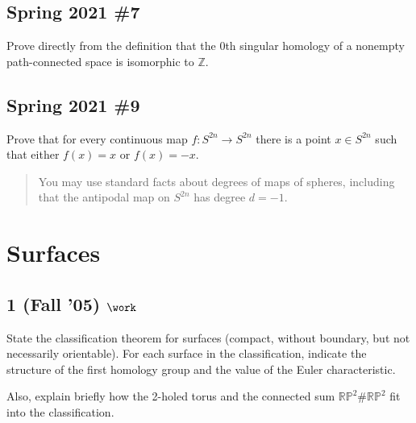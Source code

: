 \hypertarget{spring-2021-7}{%
\subsection{Spring 2021 \#7}\label{spring-2021-7}}

\begin{problem}[Spring 2021, 7]

Prove directly from the definition that the 0th singular homology of a
nonempty path-connected space is isomorphic to \({\mathbb{Z}}\).

\end{problem}

\hypertarget{spring-2021-9}{%
\subsection{Spring 2021 \#9}\label{spring-2021-9}}

\begin{problem}[Spring 2021, 9]

Prove that for every continuous map \(f: S^{2n} \to S^{2n}\) there is a
point \(x\in S^{2n}\) such that either \(f(x) = x\) or \(f(x) = -x\).

\begin{quote}
You may use standard facts about degrees of maps of spheres, including
that the antipodal map on \(S^{2n}\) has degree \(d=-1\).
\end{quote}

\end{problem}

\hypertarget{surfaces}{%
\section{Surfaces}\label{surfaces}}

\hypertarget{fall-05-work-1}{%
\subsection{\texorpdfstring{1 (Fall '05)
\(\work\)}{1 (Fall '05) \textbackslash work}}\label{fall-05-work-1}}

State the classification theorem for surfaces (compact, without
boundary, but not necessarily orientable). For each surface in the
classification, indicate the structure of the first homology group and
the value of the Euler characteristic.

Also, explain briefly how the 2-holed torus and the connected sum
\({\mathbb{RP}}^2 \# {\mathbb{RP}}^2\) fit into the classification.


